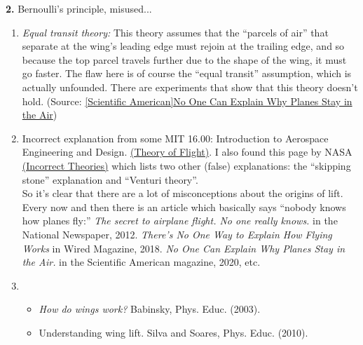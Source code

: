 \documentclass[11pt]{article}
\begin{document}
\noindent \textbf{2.} Bernoulli's principle, misused...
\begin{enumerate}
	\item \textit{Equal transit theory:} This theory assumes that the ``parcels of air'' that separate at the wing's leading edge must rejoin at the trailing edge, and so because the top parcel travels further due to the shape of the wing, it must go faster. The flaw here is of course the ``equal transit'' assumption, which is actually unfounded. There are experiments that show that this theory doesn't hold.  (Source: \href{https://www.scientificamerican.com/article/no-one-can-explain-why-planes-stay-in-the-air/#:~:text=According 20to 20the 20most 20common,time 2C 20it 20must 20go 20faster.}{[Scientific American]No One Can Explain Why Planes Stay in the Air})
	
	
	\item Incorrect explanation from some MIT 16.00: Introduction to Aerospace Engineering and Design. \href{https://web.mit.edu/16.00/www/aec/flight.html#:~:text=Air 20flowing 20over 20an 20airfoil 20will 20decrease 20in 20pressure.,This 20pressure 20force 20is 20lift.}{(Theory of Flight)}. 
	I also found this page by NASA \href{https://www.grc.nasa.gov/WWW/k-12/airplane/wrong1.html}{(Incorrect Theories)} which lists two other (false) explanations: the ``skipping stone'' explanation and ``Venturi theory''. \\
	
	
	So it's clear that there are a lot of misconceptions about the origins of lift. Every now and then there is an article which basically says ``nobody knows how planes fly:'' \textit{The secret to airplane flight. No one really knows.} in the National Newspaper, 2012. \textit{There's No One Way to Explain How Flying Works} in Wired Magazine, 2018.
	\textit{No One Can Explain Why Planes Stay in the Air.} in the Scientific American magazine, 2020, etc. 
	
	
	\item 
	\begin{itemize}
		\item \textit{How do wings work?} Babinsky, Phys. Educ. (2003).\\
		
		
		
		
		\item Understanding wing lift. Silva and Soares, Phys. Educ. (2010).\\
		
		
	\end{itemize}
\end{enumerate}
\end{document}
